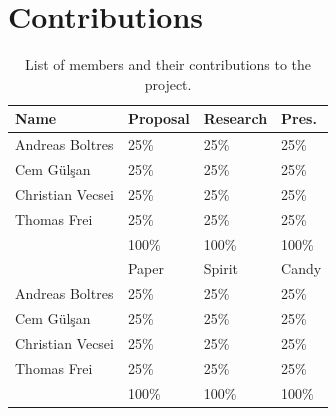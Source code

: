 \documentclass[10pt,twocolumn,letterpaper]{article}
\begin{document}
\section*{Contributions}
\label{sec:contrib}

\begin{table}[H]
\centering
\begin{tabular}{l|l l l} \hline
		Name & Proposal & Research & Pres.\\ \hline
		Andreas Boltres & 25\% & 25\% & 25\% \\
		Cem G\"ul\c{s}an & 25\% & 25\% & 25\% \\
		Christian Vecsei & 25\% & 25\% & 25\% \\
		Thomas Frei & 25\% & 25\% & 25\%  \\ \hline
		& 100\% & 100\% & 100\% \\ \hline \hline
		     & Paper & Spirit & Candy\\ \hline
		Andreas Boltres & 25\% & 25\% & 25\% \\
		Cem G\"ul\c{s}an & 25\% & 25\% & 25\% \\
		Christian Vecsei & 25\% & 25\% & 25\% \\
		Thomas Frei & 25\% & 25\% & 25\% \\ \hline
		& 100\% & 100\% & 100\% \\ \hline
\end{tabular}
\caption{List of members and their contributions to the project.}
\label{tab:contrib}
\end{table}
\end{document}
